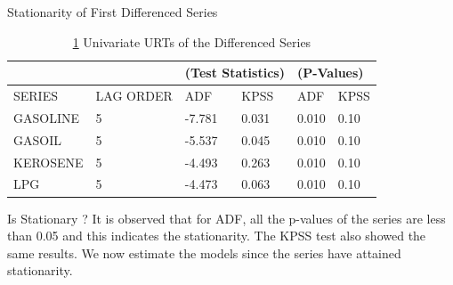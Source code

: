 \documentclass{beamer}
\begin{document}
	\begin{frame}{Stationarity of First Differenced Series}
		\begin{table}[]
			\caption{ \ref{table:stationarity_first_diff} Univariate URTs of the Differenced Series}
			\label{table:stationarity_first_diff}
			\begin{tabular}{llllll}
	\hline
	&  & \multicolumn{2}{l}{(Test Statistics)} & \multicolumn{2}{l}{(P-Values)} \\ \hline
	SERIES   &LAG ORDER & ADF    & KPSS      & ADF    & KPSS           \\
	
	GASOLINE &5         & -7.781 & 0.031     & 0.010  & 0.10          \\
	
	GASOIL   &5         & -5.537 & 0.045     & 0.010  & 0.10          \\
	
	KEROSENE &5         & -4.493 & 0.263     & 0.010  & 0.10          \\
	
	LPG      &5         & -4.473 & 0.063     & 0.010  & 0.10          \\ \hline
			\end{tabular}
		\end{table}
	
		\begin{exampleblock}{Is Stationary ?}
			\vspace{5pt}
			It is observed that for ADF, all the p-values of the series are less than 0.05 and this
			indicates the stationarity. The KPSS test also showed the same results. We now estimate the models since the series have attained stationarity.
		\end{exampleblock}
	\end{frame}
\end{document}
